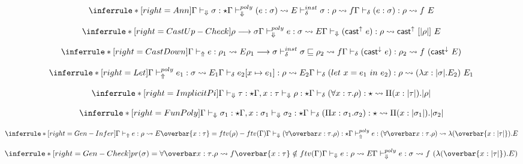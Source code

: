 \[
\inferrule*[right=Ann]
{
\checktype \sigma : \star \\
\polycheck (e:\sigma) \transto{E}\\
\instinfercheck \sigma : \rho \transto{f}}
{\infercheck (e : \sigma) : \rho \transto{f\ E}}
\]

\[
\inferrule*[right=CastUp-Check]
{ \rho \longrightarrow \sigma \\ \polycheck e : \sigma \transto{E} }
{\checktype (\castupe e) : \rho \transto{\castupe [\translated{\rho}]\ E}}
\]

\[
\inferrule*[right=CastDown]
{\infertype e : \rho_1 \transto{E}\\
\rho_1 \longrightarrow \sigma \\
\instinfercheck \sigma \sqsubseteq \rho_2\transto {f}}
{\infercheck (\castdowne e) : \rho_2 \transto {f\ (\castdowne E)}}
\]

\[
\inferrule*[right=Let]
{\polyinfer e_1 : \sigma \transto{E_1}\\
\infercheck e_2[\tpmapsto \sigma x {e_1}]: \rho \transto{E_2}
}
{\infercheck ( let\ x = e_1\ in\ e_2 ) : \rho \transto{(\lambda x:\translated \sigma. E_2)\ E_1}}
\]


\[
\inferrule*[right=ImplicitPi]
{\checktype \tau : \star \\ \Gamma, x:\tau \checktypeno \rho : \star}
{\infercheck (\forall x : \tau. \rho) : \star \transto {\Pi (x:\translated \tau). \translated \rho}}
\]


\[
\inferrule*[right=FunPoly]
{\checktype \sigma_1 : \star \\
\Gamma, x:\sigma_1 \checktypeno \sigma_2 : \star }
{\infercheck (\Pi x : \sigma_1. \sigma_2) : \star \transto{\Pi (x:\translated {\sigma_1}). \translated {\sigma_2}}}
\]


\[
\inferrule*[right=Gen-Infer]
{\infertype e :\rho \transto{E} \\ \overbar{x:\tau}=ftv(\rho)-ftv(\Gamma) \\
\checktype (\forallvars{x:\tau}. \rho):\star } {\polyinfer e :(\forallvars{x:\tau}. \rho) \transto{\lambda (\overbar{x:\translated \tau}). E}}
\]

\[
\inferrule*[right=Gen-Check]
{
pr(\sigma) = \forallvars{x:\tau}. \rho \transto{f} \\
\overbar{x:\tau} \notin ftv(\Gamma) \\
\checktype e :\rho \transto{E}
} {\polycheck e : \sigma \transto{f\ (\lambda (\overbar{x:\translated \tau}). E)}}
\]

